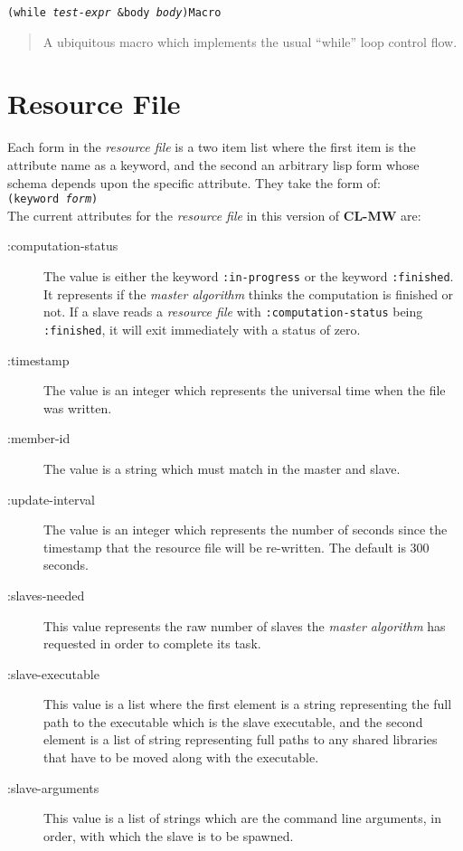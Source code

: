 \documentclass[titlepage,12pt]{book}
\newcommand{\xsmall}{\latexhtml{\small}{}}
\newcommand{\xnormalsize}{\latexhtml{\normalsize}{}}
\newcommand{\clmw}{\xsmall\textbf{CL-MW}\xnormalsize\xspace}
\newcommand{\ma}{\textit{master algorithm}\xspace}
\newcommand{\rfile}{\textit{resource file}\xspace}
\newcommand{\apifunc}[2]{\noindent\xsmall\texttt{(#1)}\hspace*{\fill}\xnormalsize\texttt{#2}}
\newenvironment{apientry}[2]
	{\apifunc{#1}{#2}\begin{quotation}}
	{\end{quotation}}
\begin{document}
\begin{apientry}
{while \emph{test-expr} \&body \emph{body}}
{Macro}
A ubiquitous macro which implements the usual ``while'' loop control flow.
\end{apientry}

\section{Resource File}
\label{resource-file}

Each form in the \rfile is a two item list where the first item
is the attribute name as a keyword, and the second an arbitrary lisp
form whose schema depends upon the specific attribute. They take the
form of:\\

\noindent\texttt{(keyword \textit{form})}\\

The current attributes for the \rfile in this version of \clmw are:

\begin{description}
\item[:computation-status] 
	The value is either the keyword \texttt{:in-progress} or the
	keyword \texttt{:finished}. It represents if the \ma thinks
	the computation is finished or not. If a slave reads a \rfile
	with \texttt{:computation-status} being \texttt{:finished},
	it will exit immediately with a status of zero.

\item[:timestamp] 
	The value is an integer which represents the universal time when the file
	was written.

\item[:member-id] 
	The value is a string which must match in the master and slave.

\item[:update-interval]
	The value is an integer which represents the number of seconds since the
	timestamp that the resource file will be re-written. The default is 300
	seconds.

\item[:slaves-needed]
	This value represents the raw number of slaves the \ma has requested in
	order to complete its task.

\item[:slave-executable]
	This value is a list where the first element is a string
	representing the full path to the executable which is the
	slave executable, and the second element is a list of string
	representing full paths to any shared libraries that have to
	be moved along with the executable.

\item[:slave-arguments]
	This value is a list of strings which are the command line arguments,
	in order, with which the slave is to be spawned.
\end{description}
\end{document}
